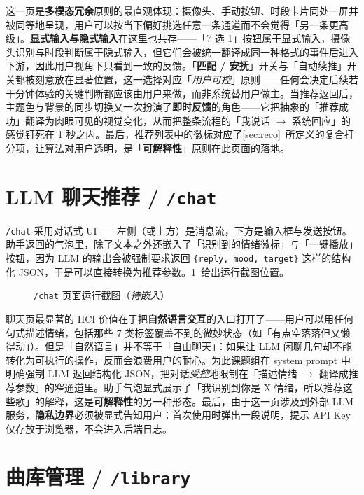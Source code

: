 这一页是\textbf{多模态冗余}原则的最直观体现：摄像头、手动按钮、时段卡片同处一屏并被同等地呈现，用户可以按当下偏好挑选任意一条通道而不会觉得「另一条更高级」。\textbf{显式输入与隐式输入}在这里也共存——「7 选 1」按钮属于显式输入，摄像头识别与时段判断属于隐式输入，但它们会被统一翻译成同一种格式的事件后进入下游，因此用户视角下只看到一致的反馈。「\textbf{匹配 / 安抚}」开关与「自动续推」开关都被刻意放在显著位置，这一选择对应「\emph{用户可控}」原则——任何会决定后续若干分钟体验的关键判断都应该由用户来做，而非系统替用户做主。当推荐返回后，主题色与背景的同步切换又一次扮演了\textbf{即时反馈}的角色——它把抽象的「推荐成功」翻译为肉眼可见的视觉变化，从而把整条流程的「我说话 $\to$ 系统回应」的感觉钉死在 1 秒之内。最后，推荐列表中的徽标对应了\cref{sec:reco}~所定义的复合打分项，让算法对用户透明，是「\textbf{可解释性}」原则在此页面的落地。

\section{LLM 聊天推荐 / \texttt{/chat}}

\texttt{/chat} 采用对话式 UI——左侧（或上方）是消息流，下方是输入框与发送按钮。助手返回的气泡里，除了文本之外还嵌入了「识别到的情绪徽标」与「一键播放」按钮，因为 LLM 的输出会被强制要求返回 \texttt{\{reply, mood, target\}} 这样的结构化 JSON，于是可以直接转换为推荐参数。\cref{fig:chat}~给出运行截图位置。

\begin{figure}[!htb]
  \centering
  \fbox{\rule{0pt}{5.5cm}\hspace{12.5cm}}
  \caption{\texttt{/chat} 页面运行截图（\textit{待嵌入}）}\label{fig:chat}
\end{figure}

聊天页最显著的 HCI 价值在于把\textbf{自然语言交互}的入口打开了——用户可以用任何句式描述情绪，包括那些 7 类标签覆盖不到的微妙状态（如「有点空落落但又懒得动」）。但是「自然语言」并不等于「自由聊天」：如果让 LLM 闲聊几句却不能转化为可执行的操作，反而会浪费用户的耐心。为此课题组在 system prompt 中明确强制 LLM 返回结构化 JSON，把对话\emph{受控}地限制在「描述情绪 $\to$ 翻译成推荐参数」的窄通道里。助手气泡显式展示了「我识别到你是 X 情绪，所以推荐这些歌」的解释，这是\textbf{可解释性}的另一种形态。最后，由于这一页涉及到外部 LLM 服务，\textbf{隐私边界}必须被显式告知用户：首次使用时弹出一段说明，提示 API Key 仅存放于浏览器，不会进入后端日志。

\section{曲库管理 / \texttt{/library}}

